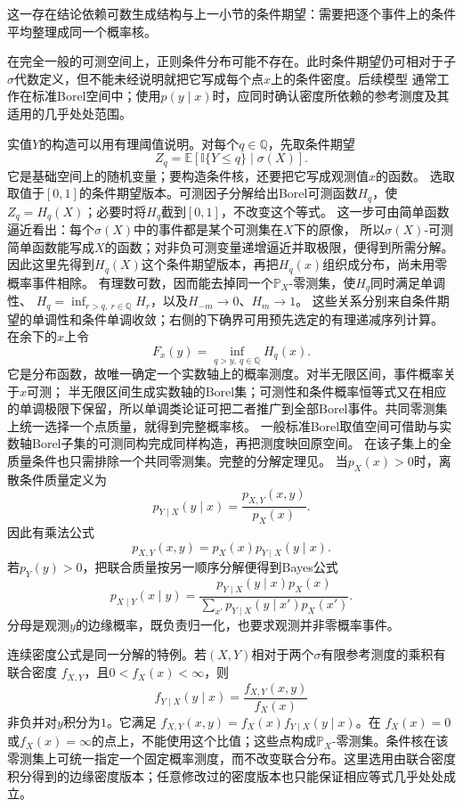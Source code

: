 这一存在结论依赖可数生成结构与上一小节的条件期望：需要把逐个事件上的条件平均整理成同一个概率核。

在完全一般的可测空间上，正则条件分布可能不存在。此时条件期望仍可相对于子\(\sigma\)代数定义，但不能未经说明就把它写成每个点\(x\)上的条件密度。后续模型
通常工作在标准Borel空间中；使用\(p(y\mid x)\)时，应同时确认密度所依赖的参考测度及其适用的几乎处处范围。

实值\(Y\)的构造可以用有理阈值说明。对每个\(q\in\mathbb Q\)，先取条件期望
\[
 Z_q=\mathbb E[\mathbb I\{Y\leq q\}\mid\sigma(X)].
\]
它是基础空间上的随机变量；要构造条件核，还要把它写成观测值\(x\)的函数。
选取取值于\([0,1]\)的条件期望版本。可测因子分解给出Borel可测函数\(H_q\)，使\(Z_q=H_q(X)\)；必要时将\(H_q\)截到\([0,1]\)，不改变这个等式。
这一步可由简单函数逼近看出：每个\(\sigma(X)\)中的事件都是某个可测集在\(X\)下的原像，
所以\(\sigma(X)\)-可测简单函数能写成\(X\)的函数；对非负可测变量递增逼近并取极限，便得到所需分解。
因此这里先得到\(H_q(X)\)这个条件期望版本，再把\(H_q(x)\)组织成分布，尚未用零概率事件相除。
有理数可数，因而能去掉同一个\(\mathbb P_X\)-零测集，使\(H_q\)同时满足单调性、
\(H_q=\inf_{r>q,\ r\in\mathbb Q}H_r\)，以及\(H_{-m}\to0\)、\(H_m\to1\)。
这些关系分别来自条件期望的单调性和条件单调收敛；右侧的下确界可用预先选定的有理递减序列计算。
在余下的\(x\)上令
\[ F_x(y)=\inf_{q>y,\ q\in\mathbb Q}H_q(x). \]
它是分布函数，故唯一确定一个实数轴上的概率测度。对半无限区间，事件概率关于\(x\)可测；
半无限区间生成实数轴的Borel集；可测性和条件概率恒等式又在相应的单调极限下保留，所以单调类论证可把二者推广到全部Borel事件。共同零测集上统一选择一个点质量，就得到完整概率核。
一般标准Borel取值空间可借助与实数轴Borel子集的可测同构完成同样构造，再把测度映回原空间。
在该子集上的全质量条件也只需排除一个共同零测集。完整的分解定理见。
当\(p_X(x)>0\)时，离散条件质量定义为
\[ p_{Y\mid X}(y\mid x)
  =\frac{p_{X,Y}(x,y)}{p_X(x)}. \]
因此有乘法公式
\[ p_{X,Y}(x,y)=p_X(x)p_{Y\mid X}(y\mid x). \]
若\(p_Y(y)>0\)，把联合质量按另一顺序分解便得到Bayes公式
\begin{equation}
  p_{X\mid Y}(x\mid y)
  =
  \frac{p_{Y\mid X}(y\mid x)p_X(x)}
       {\sum_{x'}p_{Y\mid X}(y\mid x')p_X(x')}.
  \label{eq:probability-discrete-bayes}
\end{equation}
分母是观测\(y\)的边缘概率，既负责归一化，也要求观测并非零概率事件。

连续密度公式是同一分解的特例。若\((X,Y)\)相对于两个\(\sigma\)有限参考测度的乘积有联合密度
\(f_{X,Y}\)，且\(0<f_X(x)<\infty\)，则
\[
  f_{Y\mid X}(y\mid x)
  =\frac{f_{X,Y}(x,y)}{f_X(x)}
\]
非负并对\(y\)积分为\(1\)。它满足
\(f_{X,Y}(x,y)=f_X(x)f_{Y\mid X}(y\mid x)\)。在
\(f_X(x)=0\)或\(f_X(x)=\infty\)的点上，不能使用这个比值；这些点构成\(\mathbb P_X\)-零测集。条件核在该零测集上可统一指定一个固定概率测度，而不改变联合分布。这里选用由联合密度积分得到的边缘密度版本；任意修改过的密度版本也只能保证相应等式几乎处处成立。


